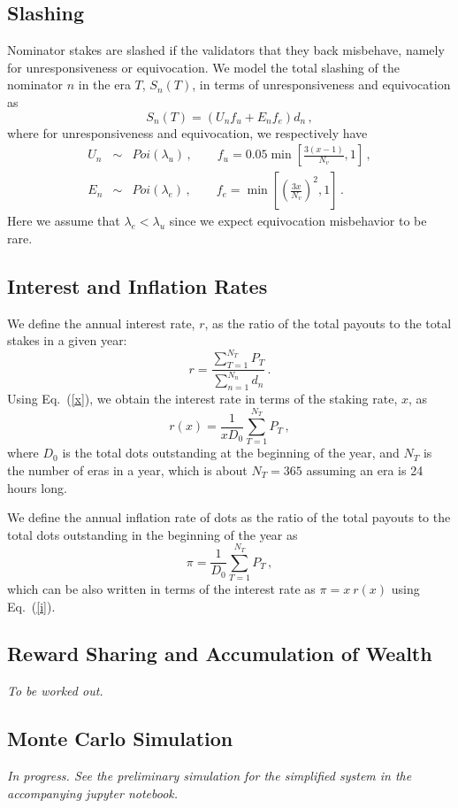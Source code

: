 \documentclass[a4,11pt]{paper}
\def\be{\begin{equation}}
\def\ee{\end{equation}}
\def\ba{\begin{eqnarray}}
\def\ea{\end{eqnarray}}
\newcommand{\per}{\, .}
\newcommand{\com}{\, ,}
\newcommand{\eref}[1]{Eq.~(\ref{#1})}
\begin{document}
\subsection{Slashing}

Nominator stakes are slashed if the validators that they back misbehave, namely for unresponsiveness or equivocation. We model the total slashing of the nominator $n$ in the era $T$, $S_n(T)$, in terms of unresponsiveness and equivocation as
\be
S_n(T) = \left(U_n f_u + E_n f_e \right) d_n \com
\ee
where for unresponsiveness and equivocation, we respectively have
\ba
U_n &\sim& Poi(\lambda_u) \com \qquad f_u = 0.05 \min\left[\frac{3(x-1)}{N_v},1 \right] \com
\\
E_n &\sim& Poi(\lambda_e) \com \qquad f_e = \min\left[\left(\frac{3x}{N_v}\right)^2,1 \right] \per
\ea 
Here we assume that $\lambda_e < \lambda_u$ since we expect equivocation misbehavior to be rare. 

\subsection{Interest and Inflation Rates}

We define the annual interest rate, $r$, as the ratio of the total payouts to the total stakes in a given year:
\be
r = \frac{\sum_{T=1}^{N_T} P_T}{\sum_{n=1}^{N_n} d_n} \per
\ee
Using \eref{x}, we obtain the interest rate in terms of the staking rate, $x$, as
\be \label{i}
r(x) = \frac{1}{x D_0} \sum_{T=1}^{N_T} P_T \com
\ee
where $D_0$ is the total dots outstanding at the beginning of the year, and $N_T$ is the number of eras in a year, which is about $N_T = 365$ assuming an era is 24 hours long. 

We define the annual inflation rate of dots as the ratio of the total payouts to the total dots outstanding in the beginning of the year as
\be
\pi = \frac{1}{D_0} \sum_{T=1}^{N_T} P_T \com
\ee
which can be also written in terms of the interest rate as $\pi = x~r(x)$ using \eref{i}.

\subsection{Reward Sharing and Accumulation of Wealth}
{\it To be worked out.}

\subsection{Monte Carlo Simulation}
{\it In progress. See the preliminary simulation for the simplified system in the accompanying jupyter notebook.}
\end{document}
